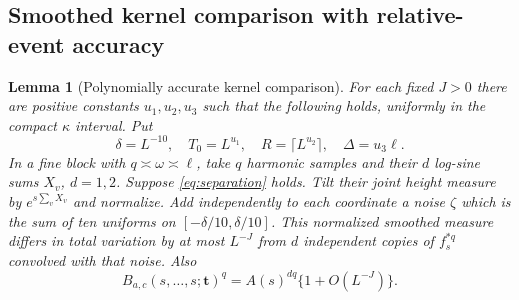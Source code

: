 \documentclass[11pt]{article}
\newtheorem{lemma}[theorem]{Lemma}
\theoremstyle{definition}\newtheorem{definition}[theorem]{Definition}
\theoremstyle{remark}\newtheorem{remark}[theorem]{Remark}
\numberwithin{equation}{section}\allowdisplaybreaks
\begin{document}
\subsection{Smoothed kernel comparison with relative-event accuracy}
\begin{lemma}[Polynomially accurate kernel comparison]\label{lem:smooth}
For each fixed $J>0$ there are positive constants $u_1,u_2,u_3$ such that
the following holds, uniformly in the compact $\kappa$ interval. Put
\begin{equation}\label{eq:smooth-params}
 \delta=L^{-10},\quad T_0=L^{u_1},\quad
 R=\lceil L^{u_2}\rceil,\quad\Delta=u_3\ell.
\end{equation}
In a fine block with $q\asymp\omega\asymp\ell$, take $q$ harmonic samples
and their $d$ log-sine sums $X_v$, $d=1,2$. Suppose \eqref{eq:separation}
holds. Tilt their joint height measure by $e^{s\sum_vX_v}$ and normalize.
Add independently to each coordinate a noise $\zeta$ which is the sum
of ten uniforms on $[-\delta/10,\delta/10]$. This normalized smoothed
measure differs in total variation by at most $L^{-J}$ from $d$
independent copies of $f_s^{*q}$ convolved with that noise. Also
\begin{equation}\label{eq:normalizer}
 B_{a,c}(s,\ldots,s;\boldsymbol t)^q
       =A(s)^{dq}\{1+O(L^{-J})\}.
\end{equation}
\end{lemma}
\end{document}
